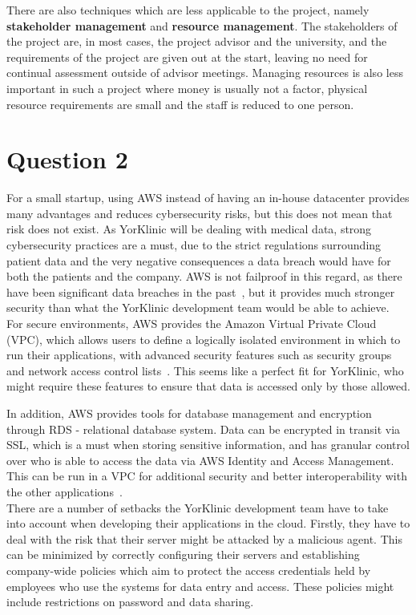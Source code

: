 \documentclass[12pt]{report}
\begin{document}
There are also techniques which are less applicable to the project, namely \textbf{stakeholder management} and \textbf{resource management}. The stakeholders of the project are, in most cases, the project advisor and the university, and the requirements of the project are given out at the start, leaving no need for continual assessment outside of advisor meetings. Managing resources is also less important in such a project where money is usually not a factor, physical resource requirements are small and the staff is reduced to one person.

\newpage
\section*{Question 2}

For a small startup, using AWS instead of having an in-house datacenter provides many advantages and reduces cybersecurity risks, but this does not mean that risk does not exist. As YorKlinic will be dealing with medical data, strong cybersecurity practices are a must, due to the strict regulations surrounding patient data and the very negative consequences a data breach would have for both the patients and the company. AWS is not failproof in this regard, as there have been significant data breaches in the past~\cite{breach}, but it provides much stronger security than what the YorKlinic development team would be able to achieve.\\

For secure environments, AWS provides the Amazon Virtual Private Cloud (VPC), which allows users to define a logically isolated environment in which to run their applications, with advanced security features such as security groups and network access control lists~\cite{vpc}. This seems like a perfect fit for YorKlinic, who might require these features to ensure that data is accessed only by those allowed.
    
In addition, AWS provides tools for database management and encryption through RDS \-- relational database system. Data can be encrypted in transit via SSL, which is a must when storing sensitive information, and has granular control over who is able to access the data via AWS Identity and Access Management. This can be run in a VPC for additional security and better interoperability with the other applications~\cite{rds}.\\

There are a number of setbacks the YorKlinic development team have to take into account when developing their applications in the cloud. Firstly, they have to deal with the risk that their server might be attacked by a malicious agent. This can be minimized by correctly configuring their servers and establishing company-wide policies which aim to protect the access credentials held by employees who use the systems for data entry and access. These policies might include restrictions on password and data sharing.\\
\end{document}

